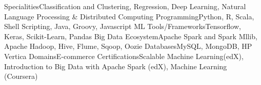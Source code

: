 \begin{cvskills}
\cvskill
{Specialities}{Classification and Clustering, Regression, Deep Learning, Natural Language Processing \& Distributed Computing}
\cvskill
{Programming}{Python, R, Scala, Shell Scripting, Java, Groovy, Javascript}
\cvskill
{ML Tools/Frameworks}{Tensorflow, Keras, Scikit-Learn, Pandas}
\cvskill
{Big Data Ecosystem}{Apache Spark and Spark Mllib, Apache Hadoop, Hive, Flume, Sqoop, Oozie}
\cvskill
{Databases}{MySQL, MongoDB, HP Vertica}
\cvskill
{Domains}{E-commerce}
\cvskill
{Certifications}{Scalable Machine Learning(edX), Introduction to Big Data with Apache Spark (edX), Machine Learning (Coursera)}
\end{cvskills}

